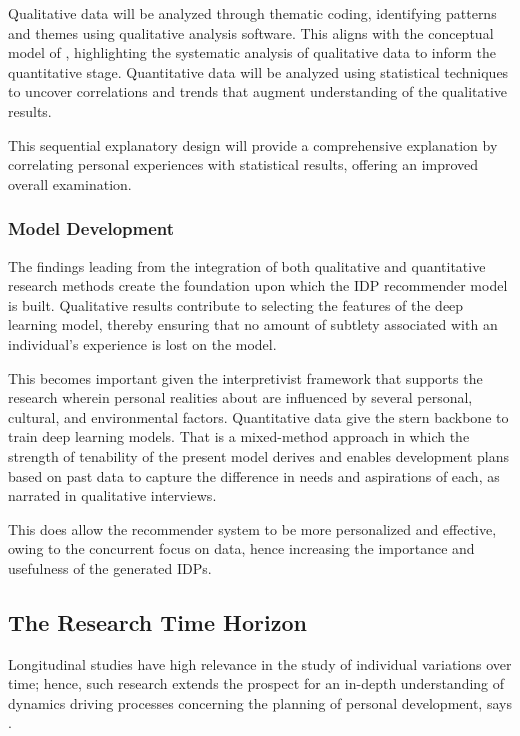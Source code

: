 Qualitative data will be analyzed through thematic coding, identifying patterns and themes using qualitative analysis software. This aligns with the conceptual model of \cite{morse2016planning}, highlighting the systematic analysis of qualitative data to inform the quantitative stage. Quantitative data will be analyzed using statistical techniques to uncover correlations and trends that augment understanding of the qualitative results.

This sequential explanatory design will provide a comprehensive explanation by correlating personal experiences with statistical results, offering an improved overall examination.

\subsubsection{Model Development}


The findings leading from the integration of both qualitative and quantitative research methods create the foundation upon which the IDP recommender model is built. Qualitative results contribute to selecting the features of the deep learning model, thereby ensuring that no amount of subtlety associated with an individual's experience is lost on the model. 


This becomes important given the interpretivist framework that supports the research wherein personal realities about \cite{speirs2020planning} are influenced by several personal, cultural, and environmental factors. Quantitative data give the stern backbone to train deep learning models. That is a mixed-method approach in which the strength of tenability of the present model derives and enables development plans based on past data to capture the difference in needs and aspirations of each, as narrated in qualitative interviews.


This does allow the recommender system to be more personalized and effective, owing to the concurrent focus on data, hence increasing the importance and usefulness of the generated IDPs.

\newpage
\subsection{The Research Time Horizon}


Longitudinal studies have high relevance in the study of individual variations over time; hence, such research extends the prospect for an in-depth understanding of dynamics driving processes concerning the planning of personal development, says \cite{kelley2011sample}.


